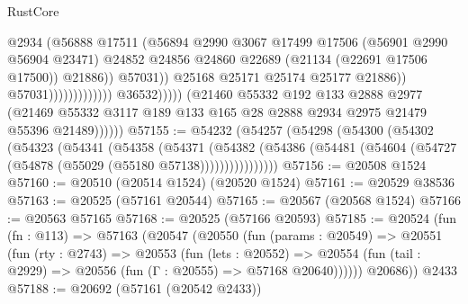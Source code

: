 \begin{lexlean}{RustCore}
\begin{coremodule}
                                                        @2934
                                                        (@56888
                                                          @17511
                                                          (@56894
                                                            @2990
                                                            @3067
                                                            @17499
                                                            @17506
                                                            (@56901 @2990 @56904 @23471)
                                                            @24852
                                                            @24856
                                                            @24860
                                                            @22689
                                                            (@21134 (@22691 @17506 @17500))
                                                            @21886))
                                                        @57031))
                                                    @25168
                                                    @25171
                                                    @25174
                                                    @25177
                                                    @21886))
                                                @57031)))))))))))))
                      @36532)))))
            (@21460
              @55332
              @192
              @133
              @2888
              @2977
              (@21469 @55332 @3117 @189 @133 @165 @28 @2888 @2934 @2975 @21479 @55396 @21489))))))
@57155 := @54232
    (@54257
      (@54298
        (@54300
          (@54302
            (@54323
              (@54341
                (@54358
                  (@54371
                    (@54382
                      (@54386 (@54481 (@54604 (@54727 (@54878 (@55029 (@55180 @57138))))))))))))))))
@57156 := @20508 @1524
@57160 := @20510 (@20514 @1524) (@20520 @1524)
@57161 := @20529 @38536
@57163 := @20525 (@57161 @20544)
@57165 := @20567 (@20568 @1524)
@57166 := @20563 @57165
@57168 := @20525 (@57166 @20593)
@57185 := @20524
    (fun (fn : @113) =>
    @57163
      (@20547
        (@20550
          (fun (params : @20549) =>
          @20551
            (fun (rty : @2743) =>
            @20553
              (fun (lets : @20552) =>
              @20554 (fun (tail : @2929) => @20556 (fun (Γ : @20555) => @57168 @20640))))))
        @20686))
    @2433
@57188 := @20692 (@57161 (@20542 @2433))

\end{coremodule}
\end{lexlean}
